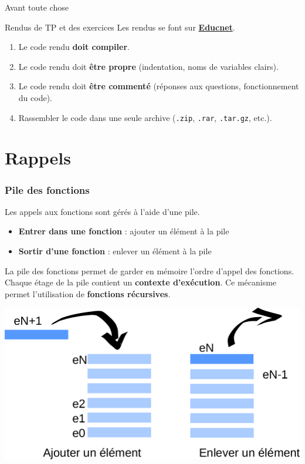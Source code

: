 
\subtitle{Allocation dynamique}
\date[27 oct. 2017]{Vendredi 27 octobre 2017}
\maketitle

\begin{frame}{Avant toute chose}
  \begin{alertblock}{Rendus de TP et des exercices}
  Les rendus se font sur \href{https://educnet.enpc.fr}{\textbf{Educnet}}.
  \begin{enumerate}
  	\item Le code rendu \textbf{doit compiler}.
    \item Le code rendu doit \textbf{être propre} (indentation, noms de variables clairs).
    \item Le code rendu doit \textbf{être commenté} (réponses aux questions, fonctionnement du code).
    \item Rassembler le code dans une seule archive (\texttt{.zip}, \texttt{.rar}, \texttt{.tar.gz}, etc.).
  \end{enumerate}
  \end{alertblock}

\end{frame}

\section{Rappels}

\begin{frame}
	\frametitle{Pile des fonctions}
    Les appels aux fonctions sont gérés à l'aide d'une pile.
    \begin{itemize}
        \item \textbf{Entrer dans une fonction} : ajouter un élément à la pile
        \item \textbf{Sortir d'une fonction} : enlever un élément à la pile
    \end{itemize}
	La pile des fonctions permet de garder en mémoire l'ordre d'appel des fonctions. Chaque étage de la pile contient un \textbf{contexte d'exécution}. Ce mécanisme permet l'utilisation de \textbf{fonctions récursives}.
	
	    \begin{center}
	        \includegraphics[width=0.6\linewidth]{images/pile.pdf}
	    \end{center}
\end{frame}

